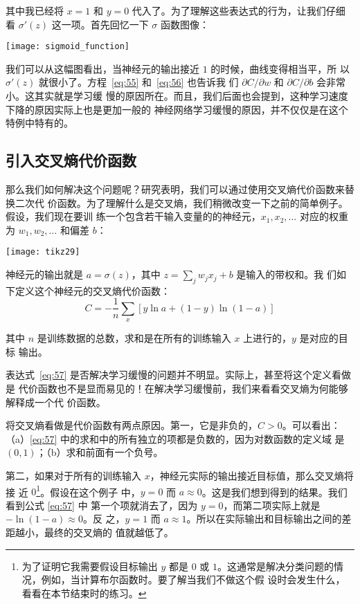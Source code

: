 其中我已经将 $x = 1$ 和 $y = 0$ 代入了。为了理解这些表达式的行为，让我们仔细
看 $\sigma'(z)$ 这一项。首先回忆一下 $\sigma$ 函数图像：
\begin{center}
  \texttt{[image: sigmoid\_function]}
\end{center}

我们可以从这幅图看出，当神经元的输出接近 $1$ 的时候，曲线变得相当平，所
以 $\sigma'(z)$ 就很小了。方程~\eqref{eq:55} 和~\eqref{eq:56} 也告诉我
们 $\partial C/\partial w$ 和 $\partial C/\partial b$ 会非常小。这其实就是学习缓
慢的原因所在。而且，我们后面也会提到，这种学习速度下降的原因实际上也是更加一般的
神经网络学习缓慢的原因，并不仅仅是在这个特例中特有的。

\subsection{引入交叉熵代价函数}
\label{sec:introducing_the_cross-entropy_cost_function}

那么我们如何解决这个问题呢？研究表明，我们可以通过使用交叉熵代价函数来替换二次代
价函数。为了理解什么是交叉熵，我们稍微改变一下之前的简单例子。假设，我们现在要训
练一个包含若干输入变量的的神经元，$x_1, x_2, \ldots$ 对应的权重为 $w_1, w_2,
\ldots$ 和偏差 $b$：

\begin{center}
  \texttt{[image: tikz29]}
\end{center}

神经元的输出就是 $a = \sigma(z)$，其中 $z = \sum_j w_j x_j+b$ 是输入的带权和。我
们如下定义这个神经元的交叉熵代价函数：
\begin{equation}
  C = -\frac{1}{n} \sum_x \left[y \ln a + (1-y ) \ln (1-a) \right]
\label{eq:57}\tag{57}
\end{equation}

其中 $n$ 是训练数据的总数，求和是在所有的训练输入 $x$ 上进行的，$y$ 是对应的目标
输出。

表达式~\eqref{eq:57} 是否解决学习缓慢的问题并不明显。实际上，甚至将这个定义看做是
代价函数也不是显而易见的！在解决学习缓慢前，我们来看看交叉熵为何能够解释成一个代
价函数。

将交叉熵看做是代价函数有两点原因。第一，它是非负的，$C > 0$。可以看出：
（a）\eqref{eq:57} 中的求和中的所有独立的项都是负数的，因为对数函数的定义域
是 $(0,1)$；（b）求和前面有一个负号。

第二，如果对于所有的训练输入 $x$，神经元实际的输出接近目标值，那么交叉熵将接
近 $0$\footnote{为了证明它我需要假设目标输出 $y$ 都是 $0$ 或
  $1$。这通常是解决分类问题的情况，例如，当计算布尔函数时。要了解当我们不做这个假
  设时会发生什么，看看在本节结束时的练习。}。假设在这个例子
中，$y=0$ 而 $a\approx 0$。这是我们想到得到的结果。我们看到公式 \eqref{eq:57} 中
第一个项就消去了，因为 $y=0$，而第二项实际上就是 $-\ln (1-a)\approx 0$。反
之，$y=1$ 而 $a\approx 1$。所以在实际输出和目标输出之间的差距越小，最终的交叉熵的
值就越低了。

